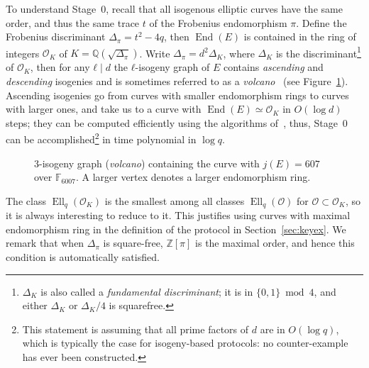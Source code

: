 \documentclass{llncs}
\newcommand{\F}{\mathbb{F}}
\renewcommand{\O}{\mathcal{O}}
\DeclareMathOperator{\End}{End}
\DeclareMathOperator{\Ell}{Ell}
\begin{document}
To understand Stage~0, recall that all isogenous elliptic curves have
the same order, and thus the same trace $t$ of the Frobenius
endomorphism $π$. Define the Frobenius discriminant $Δ_π=t^2-4q$, then
$\End(E)$ is contained in the ring of integers $\O_K$ of
$K=ℚ(\sqrt{Δ_π})$. Write $Δ_π=d^2Δ_K$, where $Δ_K$ is the
discriminant\footnote{$Δ_K$ is also called a \emph{fundamental
    discriminant}; it is in $\{0,1\}\bmod 4$, and either $Δ_K$ or
  $Δ_K/4$ is squarefree.} of $\O_K$, then for any $ℓ\mid d$ the
$ℓ$-isogeny graph of $E$ contains \emph{ascending} and
\emph{descending} isogenies and is sometimes referred to as a
\emph{volcano}~\cite{fouquet+morain02} (see Figure~\ref{fig:volcano}).
Ascending isogenies go from curves with smaller endomorphism rings to
curves with larger ones, and take us to a curve with $\End(E)≃\O_K$ in
$O(\log d)$ steps; they can be computed efficiently using the
algorithms
of~\cite{kohel,fouquet+morain02,ionica+joux13,defeo2016explicit},
thus, Stage~0 can be accomplished\footnote{This statement is assuming
  that all prime factors of $d$ are in $O(\log q)$, which is typically
  the case for isogeny-based protocols: no counter-example
	has ever been constructed.}  in time polynomial in
$\log q$.

\begin{figure}
  \centering
  \caption{$3$-isogeny graph (\emph{volcano}) containing the curve
    with $j(E)=607$ over $\F_{6007}$. A larger vertex denotes a larger
    endomorphism ring.}
  \label{fig:volcano}
\end{figure}

The class $\Ell_q(\O_K)$ is the smallest among all classes
$\Ell_q(\O)$ for $\O⊂\O_K$, so it is always interesting to
reduce to it. This justifies using curves with maximal endomorphism
ring in the definition of the protocol in
Section~\ref{sec:keyex}. We remark that when $Δ_π$ is square-free, $ℤ[π]$
is the maximal order, and hence this condition is automatically satisfied.
\end{document}
